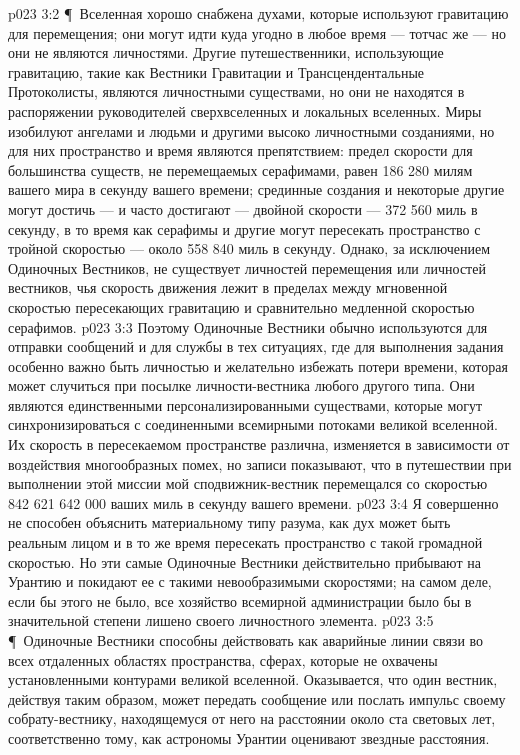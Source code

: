 \vs p023 3:2 \P\ Вселенная хорошо снабжена духами, которые используют гравитацию для перемещения; они могут идти куда угодно в любое время --- тотчас же --- но они не являются личностями. Другие путешественники, использующие гравитацию, такие как Вестники Гравитации и Трансцендентальные Протоколисты, являются личностными существами, но они не находятся в распоряжении руководителей сверхвселенных и локальных вселенных. Миры изобилуют ангелами и людьми и другими высоко личностными созданиями, но для них пространство и время являются препятствием: предел скорости для большинства существ, не перемещаемых серафимами, равен 186 280 милям вашего мира в секунду вашего времени; срединные создания и некоторые другие могут достичь --- и часто достигают --- двойной скорости --- 372 560 миль в секунду, в то время как серафимы и другие могут пересекать пространство с тройной скоростью --- около 558 840 миль в секунду. Однако, за исключением Одиночных Вестников, не существует личностей перемещения или личностей вестников, чья скорость движения лежит в пределах между мгновенной скоростью пересекающих гравитацию и сравнительно медленной скоростью серафимов.
\vs p023 3:3 Поэтому Одиночные Вестники обычно используются для отправки сообщений и для службы в тех ситуациях, где для выполнения задания особенно важно быть личностью и желательно избежать потери времени, которая может случиться при посылке личности\hyp{}вестника любого другого типа. Они являются единственными персонализированными существами, которые могут синхронизироваться с соединенными всемирными потоками великой вселенной. Их скорость в пересекаемом пространстве различна, изменяется в зависимости от воздействия многообразных помех, но записи показывают, что в путешествии при выполнении этой миссии мой сподвижник\hyp{}вестник перемещался со скоростью 842 621 642 000 ваших миль в секунду вашего времени.
\vs p023 3:4 Я совершенно не способен объяснить материальному типу разума, как дух может быть реальным лицом и в то же время пересекать пространство с такой громадной скоростью. Но эти самые Одиночные Вестники действительно прибывают на Урантию и покидают ее с такими невообразимыми скоростями; на самом деле, если бы этого не было, все хозяйство всемирной администрации было бы в значительной степени лишено своего личностного элемента.
\vs p023 3:5 \P\ Одиночные Вестники способны действовать как аварийные линии связи во всех отдаленных областях пространства, сферах, которые не охвачены установленными контурами великой вселенной. Оказывается, что один вестник, действуя таким образом, может передать сообщение или послать импульс своему собрату\hyp{}вестнику, находящемуся от него на расстоянии около ста световых лет, соответственно тому, как астрономы Урантии оценивают звездные расстояния.
